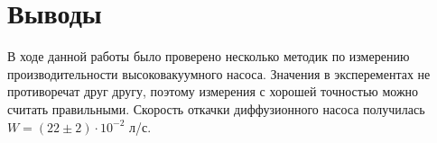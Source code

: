 \section{Выводы}

В ходе данной работы было проверено несколько методик по измерению производительности высоковакуумного насоса.
Значения в эксперементах не противоречат друг другу, поэтому измерения с хорошей точностью можно считать правильными.
Скорость откачки диффузионного насоса получилась $W = (22 \pm 2) \cdot 10^{-2}$ л/с.
